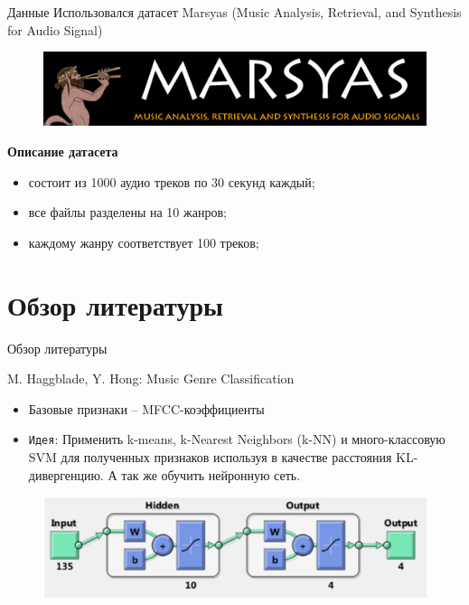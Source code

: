 \documentclass[xcolor=svgnames,handout]{beamer}
\begin{document}
  
\begin{frame}
  {Данные}
  Использовался датасет Marsyas (Music Analysis, Retrieval, and Synthesis for Audio Signal)
    
  \begin{figure}[t]
    \centering
    \includegraphics[width = 0.95\linewidth]{header}
  \end{figure}
  
  \textbf{Описание датасета}
  \begin{itemize}
      \item состоит из 1000 аудио треков по 30 секунд каждый;
      \item все файлы разделены на 10 жанров;
      \item каждому жанру соответствует 100 треков;
  \end{itemize}


\end{frame}


\section
  {Обзор литературы}
  
\begin{frame}{Обзор литературы}
  \begin{block}{M. Haggblade, Y. Hong: Music Genre Classification}
  \begin{itemize}
      \item Базовые признаки -- MFCC-коэффициенты
      \item \texttt{Идея}: Применить k-means, k-Nearest Neighbors (k-NN) и много-классовую SVM для полученных признаков используя в качестве расстояния KL-дивергенцию. А так же обучить нейронную сеть.
  \end{itemize}
  \end{block}
    \begin{figure}[t]
    \centering
    \includegraphics[width = 0.95\linewidth]{nn-structure}
  \end{figure}
\end{frame}
\end{document}
